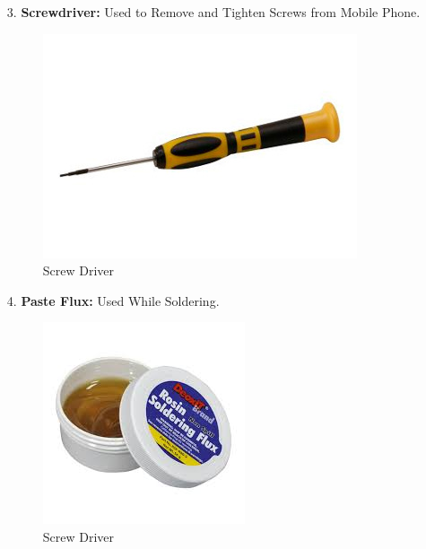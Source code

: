 \begin{itemize}
\newpage
\item[3.] \textbf{Screwdriver:} Used to Remove and Tighten Screws from Mobile Phone.
\begin{figure}[h!]
\begin{raggedright}
	\includegraphics[scale=0.5]{img/screw.PNG}
	\caption{Screw Driver}
	\label{fig:symbols}
\end{raggedright}
\end{figure}

\item[4.] \textbf{Paste Flux:} Used While Soldering.
\begin{figure}[h!]
\begin{raggedright}
	\includegraphics[scale=0.5]{img/paste.jpg}
	\caption{Screw Driver}
	\label{fig:symbols}
\end{raggedright}
\end{figure}

\end{itemize}

